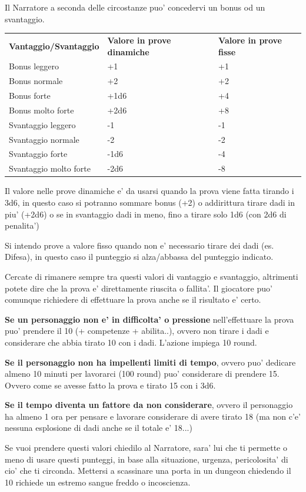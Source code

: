\documentclass[a4paper,11pt,twoside,openany]{book}
\begin{document}
Il Narratore a seconda delle circostanze puo' concedervi un bonus od un svantaggio.

\bigskip

\begin{tabular}{lll}
\toprule
\textbf{Vantaggio/Svantaggio} & \textbf{Valore in prove dinamiche} & \textbf{Valore in prove fisse}\tabularnewline
Bonus leggero & +1 & +1\tabularnewline
Bonus normale & +2 & +2\tabularnewline
Bonus forte & +1d6 & +4\tabularnewline
Bonus molto forte & +2d6 & +8\tabularnewline
Svantaggio leggero & -1 & -1\tabularnewline
Svantaggio normale & -2 & -2\tabularnewline
Svantaggio forte & -1d6 & -4\tabularnewline
Svantaggio molto forte & -2d6 & -8\tabularnewline

\end{tabular}

\bigskip

Il valore nelle prove dinamiche e' da usarsi quando la prova viene fatta tirando i 3d6, in questo caso si potranno sommare bonus (+2) o addirittura tirare dadi in piu' (+2d6) o se in svantaggio dadi in meno, fino a tirare solo 1d6 (con 2d6 di penalita')

Si intendo prove a valore fisso quando non e' necessario tirare dei dadi (es. Difesa), in questo caso il punteggio si alza/abbassa del punteggio indicato.

Cercate di rimanere sempre tra questi valori di vantaggio e svantaggio, altrimenti potete dire che la prova e' direttamente riuscita o fallita'.
Il giocatore puo' comunque richiedere di effettuare la prova anche se il risultato e' certo.

\textbf{Se un personaggio non e' in difficolta' o pressione} nell'effettuare la prova puo' prendere il 10 (+ competenze + abilita..), ovvero non tirare i dadi e considerare che abbia tirato 10 con i dadi. L'azione impiega 10 round.

\textbf{Se il personaggio non ha impellenti limiti di tempo}, ovvero puo' dedicare almeno 10 minuti per lavorarci (100 round) puo' considerare di prendere 15. Ovvero come se avesse fatto la prova e tirato 15 con i 3d6.

\textbf{Se il tempo diventa un fattore da non considerare}, ovvero il personaggio ha almeno 1 ora per pensare e lavorare considerare di avere tirato 18 (ma non c'e' nessuna esplosione di dadi anche se il totale e' 18...)

Se vuoi prendere questi valori chiedilo al Narratore, sara' lui che ti permette o meno di usare questi punteggi, in base alla situazione, urgenza, pericolosita' di cio' che ti circonda. Mettersi a scassinare una porta in un dungeon chiedendo il 10 richiede un estremo sangue freddo o incoscienza.
\end{document}
